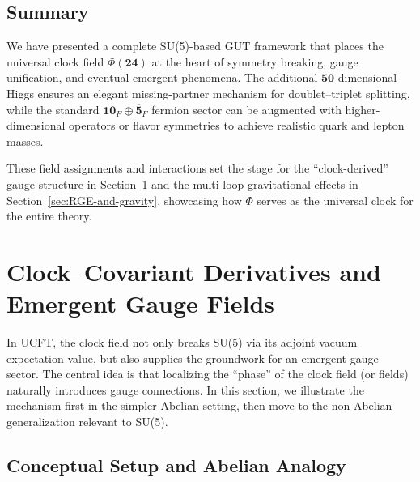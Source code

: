 \documentclass[aps,prd,preprint,groupedaddress]{revtex4-2}
\begin{document}
\subsection{Summary}
\label{subsec:sec2-conclusions}

We have presented a complete SU(5)-based GUT framework that places the universal clock field \(\Phi(\mathbf{24})\) at the heart of symmetry breaking, gauge unification, and eventual emergent phenomena.  
The additional \(\mathbf{50}\)-dimensional Higgs ensures an elegant missing-partner mechanism for doublet--triplet splitting, while the standard \(\mathbf{10}_F\oplus\mathbf{\overline{5}}_F\) fermion sector can be augmented with higher-dimensional operators or flavor symmetries to achieve realistic quark and lepton masses.  

These field assignments and interactions set the stage for the “clock-derived” gauge structure in Section~\ref{sec:clock-derivative} and the multi-loop gravitational effects in Section~\ref{sec:RGE-and-gravity}, showcasing how \(\Phi\) serves as the universal clock for the entire theory.


\section{Clock--Covariant Derivatives and Emergent Gauge Fields}
\label{sec:clock-derivative}

In UCFT, the clock field not only breaks SU(5) via its adjoint vacuum expectation value, but also supplies the groundwork for an emergent gauge sector. 
The central idea is that localizing the ``phase'' of the clock field (or fields) naturally introduces gauge connections. In this section, we illustrate the mechanism first in the simpler Abelian setting, then move to the non-Abelian generalization relevant to SU(5). 

\subsection{Conceptual Setup and Abelian Analogy}
\label{subsec:abelian-example}
\end{document}
